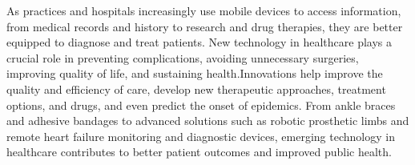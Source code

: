 \documentclass[12pt,a4paper]{report}
\begin{document}
As practices and hospitals increasingly use mobile devices to access information, from medical records and history to research and drug therapies, they are better equipped to diagnose and treat patients. New technology in healthcare plays a crucial role in preventing complications, avoiding unnecessary surgeries, improving quality of life, and sustaining health.Innovations help improve the quality and efficiency of care, develop new therapeutic approaches, treatment options, and drugs, and even predict the onset of epidemics. From ankle braces and adhesive bandages to advanced solutions such as robotic prosthetic limbs and remote heart failure monitoring and diagnostic devices, emerging technology in healthcare contributes to better patient outcomes and improved public health.\par
\end{document}
